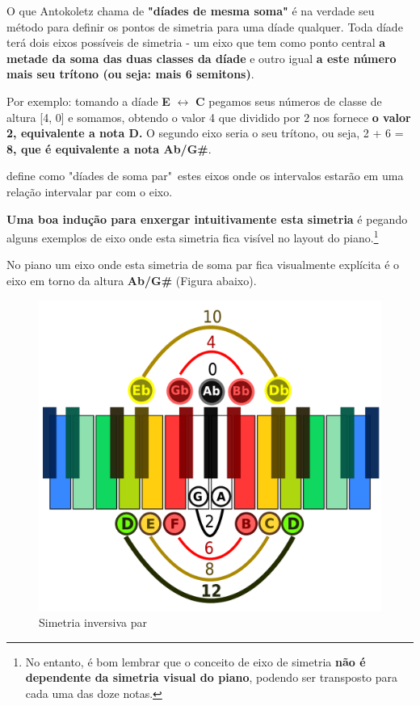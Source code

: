 \documentclass[
	12pt,				%
	openright,			%
	twoside,			%
	a4paper,			%
	english,			%
	french,				%
	spanish,			%
	brazil				%
	]{abntex2}
\begin{document}
O que Antokoletz chama de \textbf{"díades de mesma soma"} é na verdade seu método para definir os pontos de simetria para uma díade qualquer. Toda díade terá dois eixos possíveis de simetria - um eixo que tem como ponto central \textbf{a metade da soma das duas classes da díade} e outro igual \textbf{a este número mais seu trítono (ou seja: mais 6 semitons)}. 

Por exemplo: tomando a díade \textbf{E} $\leftrightarrow $ \textbf{C} pegamos seus números de classe de altura [4, 0] e somamos, obtendo o valor 4 que dividido por 2 nos fornece \textbf{o valor 2, equivalente a nota D.} O segundo eixo seria o seu trítono, ou seja, 2 + 6 =\textbf{ 8, que é equivalente a nota Ab/G\#}. 
\pagebreak

 define como "díades de soma par"\ estes eixos onde os intervalos estarão em uma relação intervalar par com o eixo.

\textbf{Uma boa indução para enxergar intuitivamente esta simetria} é pegando alguns exemplos de eixo onde esta simetria fica visível no layout do piano.\footnote{No entanto, é bom lembrar que o conceito de eixo de simetria \textbf{não é dependente  da simetria visual do piano}, podendo ser transposto para cada uma das doze notas.}

No piano um eixo onde esta simetria de soma par fica visualmente explícita é o eixo em torno da altura \textbf{Ab/G\#} (Figura abaixo).

\begin{figure}[!h]
	\caption{\label{fig_grafico}Simetria inversiva par}
	\begin{center}
	    \includegraphics[scale=0.3]{axis/simetriainversiva_par.pdf}
	\end{center}
\end{figure}
\end{document}

